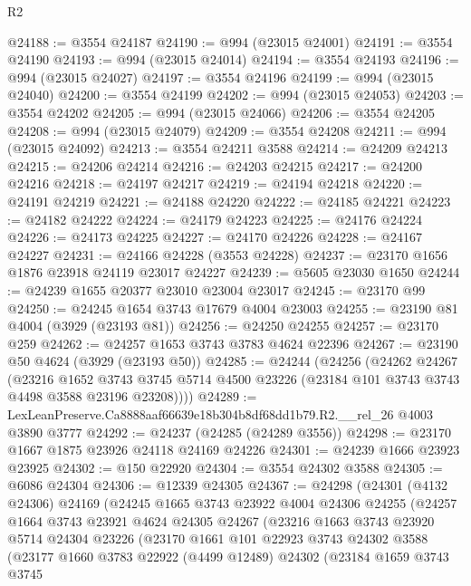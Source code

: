 \begin{lexlean}{R2}
\begin{coremodule}
@24188 := @3554 @24187
@24190 := @994 (@23015 @24001)
@24191 := @3554 @24190
@24193 := @994 (@23015 @24014)
@24194 := @3554 @24193
@24196 := @994 (@23015 @24027)
@24197 := @3554 @24196
@24199 := @994 (@23015 @24040)
@24200 := @3554 @24199
@24202 := @994 (@23015 @24053)
@24203 := @3554 @24202
@24205 := @994 (@23015 @24066)
@24206 := @3554 @24205
@24208 := @994 (@23015 @24079)
@24209 := @3554 @24208
@24211 := @994 (@23015 @24092)
@24213 := @3554 @24211 @3588
@24214 := @24209 @24213
@24215 := @24206 @24214
@24216 := @24203 @24215
@24217 := @24200 @24216
@24218 := @24197 @24217
@24219 := @24194 @24218
@24220 := @24191 @24219
@24221 := @24188 @24220
@24222 := @24185 @24221
@24223 := @24182 @24222
@24224 := @24179 @24223
@24225 := @24176 @24224
@24226 := @24173 @24225
@24227 := @24170 @24226
@24228 := @24167 @24227
@24231 := @24166 @24228 (@3553 @24228)
@24237 := @23170 @1656 @1876 @23918 @24119 @23017 @24227
@24239 := @5605 @23030 @1650
@24244 := @24239 @1655 @20377 @23010 @23004 @23017
@24245 := @23170 @99
@24250 := @24245 @1654 @3743 @17679 @4004 @23003
@24255 := @23190 @81 @4004 (@3929 (@23193 @81))
@24256 := @24250 @24255
@24257 := @23170 @259
@24262 := @24257 @1653 @3743 @3783 @4624 @22396
@24267 := @23190 @50 @4624 (@3929 (@23193 @50))
@24285 := @24244
    (@24256
      (@24262
        @24267
        (@23216
          @1652
          @3743
          @3745
          @5714
          @4500
          @23226
          (@23184 @101 @3743 @3743 @4498 @3588 @23196 @23208))))
@24289 := LexLeanPreserve.Ca8888aaf66639e18b304b8df68dd1b79.R2.__rel_26 @4003 @3890 @3777
@24292 := @24237 (@24285 (@24289 @3556))
@24298 := @23170 @1667 @1875 @23926 @24118 @24169 @24226
@24301 := @24239 @1666 @23923 @23925
@24302 := @150 @22920
@24304 := @3554 @24302 @3588
@24305 := @6086 @24304
@24306 := @12339 @24305
@24367 := @24298
    (@24301
      (@4132 @24306)
      @24169
      (@24245
        @1665
        @3743
        @23922
        @4004
        @24306
        @24255
        (@24257
          @1664
          @3743
          @23921
          @4624
          @24305
          @24267
          (@23216
            @1663
            @3743
            @23920
            @5714
            @24304
            @23226
            (@23170
              @1661
              @101
              @22923
              @3743
              @24302
              @3588
              (@23177
                @1660
                @3783
                @22922
                (@4499 @12489)
                @24302
                (@23184
                  @1659
                  @3743
                  @3745

\end{coremodule}
\end{lexlean}
